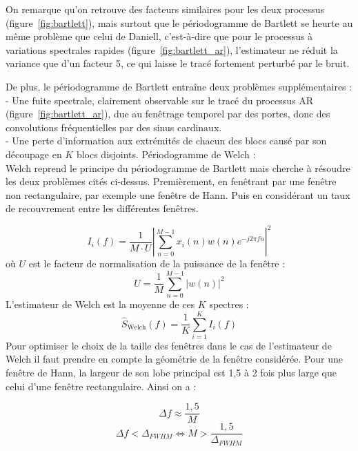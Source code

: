 \documentclass[11pt,a4paper]{article}
\begin{document}
\indent On remarque qu'on retrouve des facteurs similaires pour les deux processus (figure~\ref{fig:bartlett}), mais surtout que le périodogramme de Bartlett se heurte au même problème que celui de Daniell, c'est-à-dire que pour le processus à variations spectrales rapides (figure~\ref{fig:bartlett_ar}), l'estimateur ne réduit la variance que d'un facteur 5, ce qui laisse le tracé fortement perturbé par le bruit.

De plus, le périodogramme de Bartlett entraîne deux problèmes supplémentaires :
\\- Une fuite spectrale, clairement observable sur le tracé du processus AR (figure~\ref{fig:bartlett_ar}), due au fenêtrage temporel par des portes, donc des convolutions fréquentielles par des sinus cardinaux.
\\- Une perte d'information aux extrémités de chacun des blocs causé par son découpage en $K$ blocs disjoints.
\newline
Périodogramme de Welch :\\
\indent Welch reprend le principe du périodogramme de Bartlett mais cherche à résoudre les deux problèmes cités ci-dessus. Premièrement, en fenêtrant par une fenêtre non rectangulaire, par exemple une fenêtre de Hann. Puis en considérant un taux de recouvrement entre les différentes fenêtres.

\begin{equation}
  I_i(f) = \frac{1}{M \cdot U} \left| \sum_{n=0}^{M-1} x_i(n) w(n) e^{-j 2 \pi f n} \right|^2
\end{equation}
  où $U$ est le facteur de normalisation de la puissance de la fenêtre :
\begin{equation}
  U = \frac{1}{M} \sum_{n=0}^{M-1} |w(n)|^2
\end{equation}
  L'estimateur de Welch est la moyenne de ces $K$ spectres :
\begin{equation}
  \hat{S}_{\text{Welch}}(f) = \frac{1}{K} \sum_{i=1}^{K} I_i(f)
\end{equation}
Pour optimiser le choix de la taille des fenêtres dans le cas de l'estimateur de Welch il faut prendre en compte la géométrie de la fenêtre considérée. Pour une fenêtre de Hann, la largeur de son lobe principal est 1,5 à 2 fois plus large que celui d'une fenêtre rectangulaire. Ainsi on a :

\begin{equation}
    \Delta f \approx \frac{1{,}5}{M}
\end{equation}
\begin{equation}
    \Delta f < \Delta_{FWHM} \iff M > \frac{1{,}5}{\Delta_{FWHM}}
\end{equation}
\end{document}
